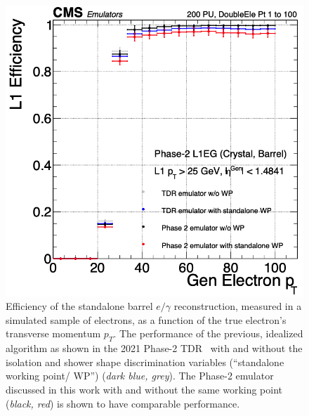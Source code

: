 \begin{figure}[ht]
    \centering
    \includegraphics[width=12cm]{figures/ch-3-phase2/results-egamma-efficiency-gt25.png}
    \caption[Efficiency of the standalone barrel $e/\gamma$ reconstruction, as a function of the true electron's transverse momentum $p_{T}$.]{Efficiency of the standalone barrel $e/\gamma$ reconstruction, measured in a simulated sample of electrons, as a function of the true electron's transverse momentum $p_{T}$. The performance of the previous, idealized algorithm as shown in the 2021 Phase-2 TDR~\cite{CMS-TDR-021} with and without the isolation and shower shape discrimination variables (``standalone working point/ WP'') (\textit{dark blue, grey}). The Phase-2 emulator discussed in this work with and without the same working point (\textit{black, red}) is shown to have comparable performance.}
    \label{fig:results-egamma-efficiency-gt25}
\end{figure}


